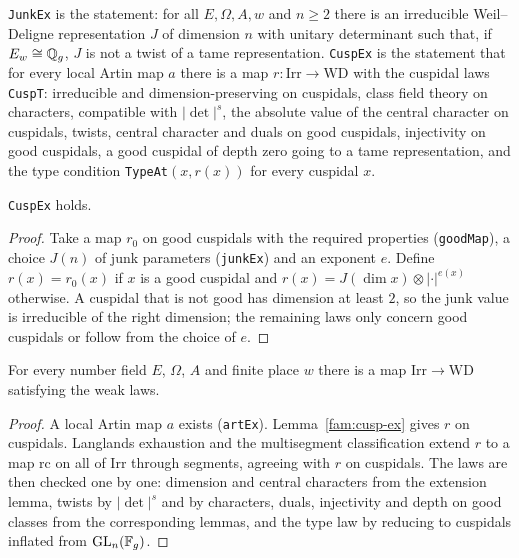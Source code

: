 \begin{definition}\label{fam:junk-ex}
\texttt{JunkEx} is the statement: for all $E,\Omega,A,w$ and $n\ge2$ there is an irreducible Weil--Deligne representation $J$ of dimension $n$ with unitary determinant such that, if $E_w\cong\mathbb{Q}_g$, $J$ is not a twist of a tame representation. \texttt{CuspEx} is the statement that for every local Artin map $a$ there is a map $r\colon\mathrm{Irr}\to\mathrm{WD}$ with the cuspidal laws \texttt{CuspT}: irreducible and dimension-preserving on cuspidals, class field theory on characters, compatible with $|\det|^s$, the absolute value of the central character on cuspidals, twists, central character and duals on good cuspidals, injectivity on good cuspidals, a good cuspidal of depth zero going to a tame representation, and the type condition \texttt{TypeAt}$(x, r(x))$ for every cuspidal $x$.
\end{definition}

\begin{lemma}\label{fam:cusp-ex}
\texttt{CuspEx} holds.
\end{lemma}
\begin{proof}
Take a map $r_0$ on good cuspidals with the required properties (\texttt{goodMap}), a choice $J(n)$ of junk parameters (\texttt{junkEx}) and an exponent $e$. Define $r(x)=r_0(x)$ if $x$ is a good cuspidal and $r(x)=J(\dim x)\otimes|\cdot|^{e(x)}$ otherwise. A cuspidal that is not good has dimension at least $2$, so the junk value is irreducible of the right dimension; the remaining laws only concern good cuspidals or follow from the choice of $e$.
\end{proof}

\begin{theorem}\label{fam:rect-exists-thm}
For every number field $E$, $\Omega$, $A$ and finite place $w$ there is a map $\mathrm{Irr}\to\mathrm{WD}$ satisfying the weak laws.
\end{theorem}
\begin{proof}
A local Artin map $a$ exists (\texttt{artEx}). Lemma~\ref{fam:cusp-ex} gives $r$ on cuspidals. Langlands exhaustion and the multisegment classification extend $r$ to a map $\mathrm{rc}$ on all of $\mathrm{Irr}$ through segments, agreeing with $r$ on cuspidals. The laws are then checked one by one: dimension and central characters from the extension lemma, twists by $|\det|^s$ and by characters, duals, injectivity and depth on good classes from the corresponding lemmas, and the type law by reducing to cuspidals inflated from $\mathrm{GL}_n(\mathbb{F}_g)$.
\end{proof}

